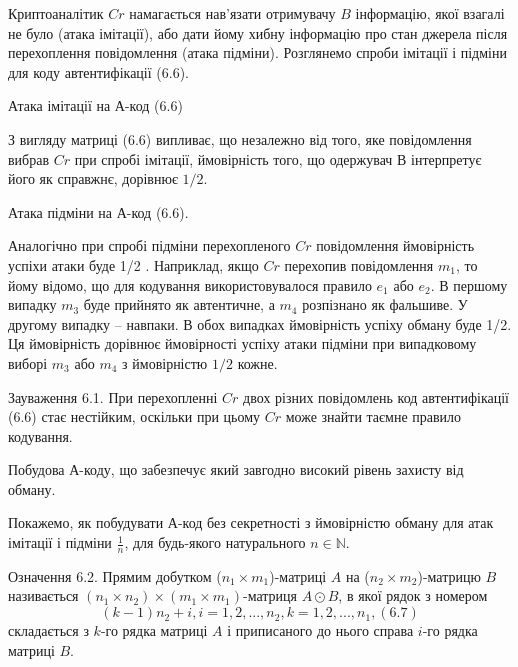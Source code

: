 Криптоаналітик $Cr$ намагається нав’язати отримувачу $B$ інформацію, якої
взагалі не було (атака імітації), або дати йому хибну інформацію про стан
джерела після перехоплення повідомлення (атака підміни). Розглянемо
спроби імітації і підміни для коду автентифікації (6.6).

Атака імітації на А-код (6.6)

З вигляду матриці (6.6) випливає, що незалежно від того, яке
повідомлення вибрав $Cr$ при спробі імітації, ймовірність того, що одержувач
В інтерпретує його як справжнє, дорівнює $1/2$.

Атака підміни на А-код (6.6).

Аналогічно при спробі підміни перехопленого $Cr$ повідомлення ймовірність
успіхи атаки буде 1/2 . Наприклад, якщо $Cr$ перехопив повідомлення $m_1$, то
йому відомо, що для кодування використовувалося правило $e_1$ або $e_2$. В
першому випадку $m_3$ буде прийнято як автентичне, а $m_4$ розпізнано як фальшиве.
У другому випадку -- навпаки. В обох випадках ймовірність успіху обману буде
1/2. Ця ймовірність дорівнює ймовірності успіху атаки підміни при випадковому
виборі $m_3$ або $m_4$ з ймовірністю $1/2$ кожне.

\begin{remark}
    Зауваження 6.1. При перехопленні $Cr$ двох різних повідомлень код
    автентифікації (6.6) стає нестійким, оскільки при цьому $Cr$ може знайти таємне
    правило кодування.
\end{remark}

Побудова А-коду, що забезпечує який завгодно високий рівень
захисту від обману.

Покажемо, як побудувати А-код без секретності з ймовірністю обману для
атак імітації і підміни $\frac{1}{n}$, для будь-якого натурального $n \in \mathbb{N}$.

\begin{definition}
    Означення 6.2. Прямим добутком ($n_1 \times m_1$)-матриці $A$ на ($n_2 \times m_2$)-матрицю $B$
    називається $(n_1 \times n_2) \times (m_1 \times m_1)$-матриця $A \odot B$, в якої рядок з номером
    \begin{equation}
        (k - 1) n_2 + i, i = 1, 2, ..., n_2, k = 1, 2, ..., n_1, (6.7)
    \end{equation}
    складається з $k$-го рядка матриці $A$ і приписаного до нього справа $i$-го рядка
    матриці $B$.
\end{definition}

